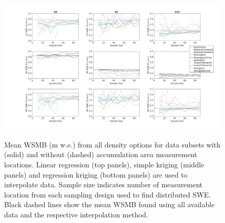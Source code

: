 \documentclass[12pt]{article}
\begin{document}
\begin{landscape}
\begin{figure}[H]
	\centering
	\includegraphics[height =0.9\textwidth]{SubsetInterpSizeCompile_SWE.png}\\
	\caption{Mean WSMB (m w.e.) from all density options for data subsets with (solid) and without (dashed) accumulation area measurement locations. Linear regression (top panels), simple kriging (middle panels) and regression kriging (bottom panels) are used to interpolate data. Sample size indicates number of measurement location from each sampling design used to find distributed SWE. Black dashed lines show the mean WSMB found using all available data and the respective interpolation method.  }
	\label{fig:SubsetInterpSizeCompile_SWE}
\end{figure}


\end{landscape}
\end{document}
